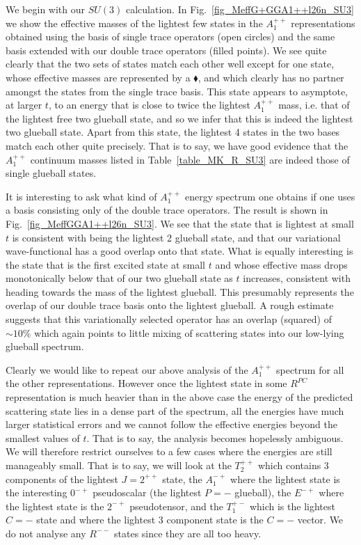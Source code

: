 \documentclass[12pt]{article}
\begin{document}
We begin with our $SU(3)$ calculation. In Fig.~\ref{fig_MeffG+GGA1++l26n_SU3} we
show the effective masses of the lightest few states in the $A_1^{++}$ representations
obtained using the basis of single trace operators (open circles) and the same basis
extended with our double trace operators (filled points). We see quite clearly
that the two sets of states match each other well except for one state, whose effective
masses are represented by a $\blacklozenge$, and which clearly has no partner amongst
the states from the single trace basis. This state appears to asymptote, at larger
$t$, to an energy that is close to twice the lightest $A_1^{++}$ mass, i.e. that of the
lightest free two glueball state, and so we infer that this is indeed the
lightest two glueball state. Apart from this state, the lightest 4 states in the
two bases match each other quite precisely. That is to say, we have good evidence
that the $A_1^{++}$ continuum masses listed in Table~\ref{table_MK_R_SU3} are indeed
those of single glueball states.

It is interesting to ask what kind of $A_1^{++}$ energy spectrum one obtains if one
uses a basis consisting only of the double trace operators. The result is shown
in Fig.~\ref{fig_MeffGGA1++l26n_SU3}. We see that the state that is lightest at small $t$
is consistent with being the lightest 2 glueball state, and that our variational
wave-functional has a good overlap onto that state. What is equally interesting is
the state that is the first excited state at small $t$ and whose effective mass
drops monotonically below that of our two glueball state as $t$ increases, consistent
with heading towards the mass of the lightest glueball. This presumably represents
the overlap of our double trace basis onto the lightest glueball. A rough estimate suggests
that this variationally selected operator has an overlap (squared) of $\sim 10\%$
which again points to little mixing of scattering states into our low-lying
glueball spectrum.

Clearly we would like to repeat our above analysis of the  $A_1^{++}$ spectrum for all 
the other representations. However once the lightest state in some $R^{PC}$ representation
is much heavier than in the above case the energy of the predicted scattering state
lies in a dense part of the spectrum, all the energies have much larger statistical errors
and we cannot follow the effective energies beyond the smallest values of $t$. That is to
say, the analysis becomes hopelessly ambiguous. We will therefore restrict ourselves to
a few cases where the energies are still manageably small. That is to say, we will
look at the $T_2^{++}$ which contains 3 components of the lightest $J=2^{++}$ state,
the  $A_1^{-+}$ where the lightest state is the interesting $0^{-+}$ pseudoscalar
(the lightest $P=-$ glueball),
the  $E^{-+}$ where the lightest state is the $2^{-+}$ pseudotensor, and the $T_1^{+-}$
which is the lightest $C=-$ state and where the lightest 3 component state is the
$C=-$ vector. We do not analyse any $R^{--}$ states since they are all too heavy.
\end{document}
